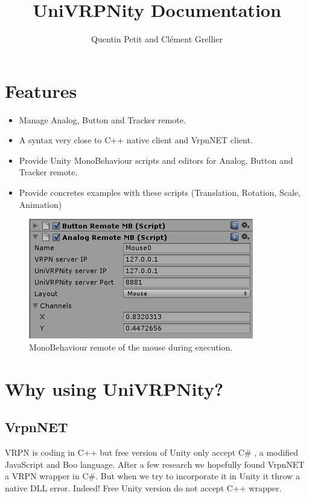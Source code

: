 \documentclass[11pt]{article} %
\title{UniVRPNity Documentation}
\author{Quentin Petit and Clément Grellier}
\date{}
\begin{document}
\maketitle

\section{Features}

\begin{itemize}
 \item Manage Analog, Button and Tracker remote.
 \item A syntax very close to C++ native client and VrpnNET client.
 \item Provide Unity MonoBehaviour scripts and editors for Analog, Button and Tracker remote.
 \item Provide concretes examples with these scripts (Translation, Rotation, Scale, Animation)
\end{itemize}


\begin{figure}[H]
	\begin{center}
	\includegraphics{UnityScript.png}
	\caption{MonoBehaviour remote of the mouse during execution.}
	\end{center}
\end{figure}

\section{Why using UniVRPNity?}

\subsection{VrpnNET}
VRPN is coding in C++ but free version of Unity only accept C\# ,  a modified JavaScript and Boo language.
After a few research we hopefully found VrpnNET a VRPN wrapper in C\#. 
But when we try to incorporate it in Unity it throw a native DLL error. 
Indeed! Free Unity version do not accept C++ wrapper.
\end{document}
